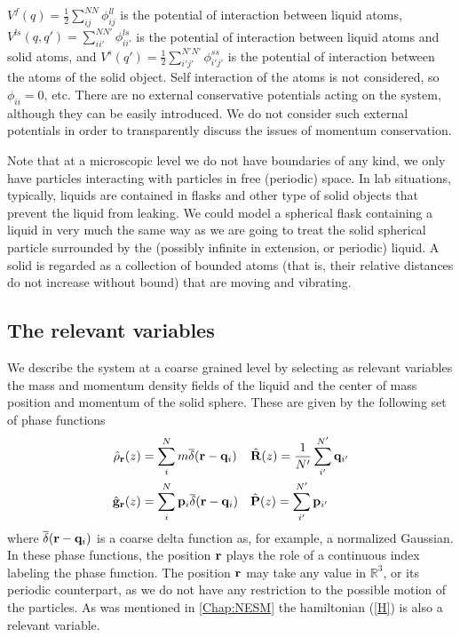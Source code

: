 \documentclass[b5paper,openright,11pt]{book}
\begin{document}
$V^{f}(q)=\frac{1}{2}\sum^{{NN}}_{i   j}\phi^{ll}_{ij}$   is   the
potential  of  interaction  between   liquid  atoms,  $  V^{ls}(q,q')=
\sum^{NN'}_{ii'}\phi^{ls}_{ii'}$  is  the   potential  of  interaction
between   liquid   atoms   and   solid   atoms,   and   $   V^{s}(q')=
\frac{1}{2}\sum^{{N'N'}}_{i' j'}\phi^{ss}_{i'j'}$ is the potential
of  interaction  between   the  atoms  of  the   solid  object.   Self
interaction of  the atoms  is not  considered, so  $\phi_{ii}=0$, etc.
There are  no external conservative  potentials acting on  the system,
although  they can  be  easily  introduced. We  do  not consider  such
external potentials  in order to  transparently discuss the  issues of
momentum conservation.

Note that at a microscopic level we do not have boundaries of
  any kind, we only have particles interacting with particles in free
(periodic) space.  In lab  situations, typically, liquids are contained
in flasks and other type of  solid objects that prevent the liquid from
leaking.  We could model a spherical  flask containing a liquid in very
much  the same  way  as we  are  going to  treat  the solid  spherical
particle  surrounded  by  the  (possibly  infinite  in  extension,  or
periodic)  liquid. A solid is
  regarded as a collection of  bounded atoms (that is, their relative
distances  do  not  increase  without   bound)  that  are  moving  and
vibrating. 

\subsection{The relevant variables}
We describe the system at a coarse grained level by selecting as
relevant variables the mass and momentum density fields  of the liquid
and  the   center  of  mass   position  and  momentum  of   the  solid
sphere. These are given by the following set of phase functions 
\begin{align}
  \hat{\rho}_{\bf r}(z) &=\sum^{N}_im\overline{\delta}({\bf r}-{\bf q}_i)
&&\hat{\bf R}(z)=\frac{1}{N'}\sum_{i'}^{N'}{\bf q}_{i'}
\nonumber\\
  \hat{\bf g}_{\bf r}(z) &=\sum^{N}_i{\bf p}_i\overline{\delta}({\bf r}-{\bf q}_i)
&&\hat{\bf P}(z)=\sum_{i'}^{N'}{\bf p}_{i'}
\label{CGvar}
\end{align}
where $\overline{\delta}({\bf r}-{\bf q}_i)$ is a coarse delta function as, for example, a normalized Gaussian.
In these phase  functions, the position ${\bf r}$ plays  the role of a
continuous index labeling  the phase function. The  position ${\bf r}$
may take any value in  $\mathbb{R}^3$, or its periodic counterpart, as
we  do  not  have  any  restriction to  the  possible  motion  of  the
particles. As was mentioned in \ref{Chap:NESM} the hamiltonian (\ref{H}) is also a relevant variable.
\end{document}
